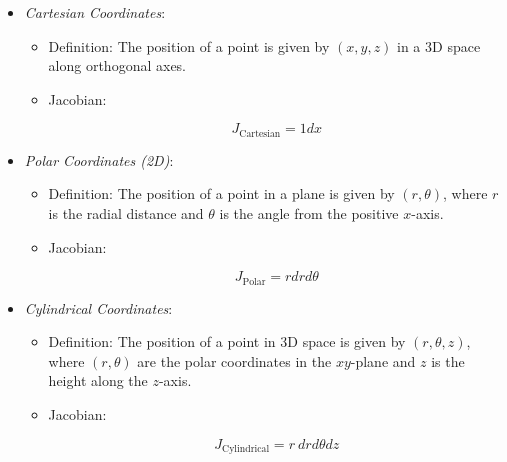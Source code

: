 \begin{itemize}

    \item \emph{Cartesian Coordinates}:

    \begin{itemize}
        
        \item Definition: The position of a point is given by \((x, y, z)\) in a 3D space along 
              orthogonal axes.
        
        \item Jacobian: 
        
            \[
                J_{\text{Cartesian}} = 1dx
            \]
    
    \end{itemize}

    \item \emph{Polar Coordinates (2D)}:

    \begin{itemize}

        \item Definition: The position of a point in a plane is given by \((r, \theta)\), where \(r\) 
              is the radial distance and \(\theta\) is the angle from the positive \(x\)-axis.
        
        \item Jacobian:
        
        \[
            J_{\text{Polar}} = rd rd\theta
        \]

    \end{itemize}

    \item \emph{Cylindrical Coordinates}:

    \begin{itemize}
        
        \item Definition: The position of a point in 3D space is given by \((r, \theta, z)\), where 
              \((r, \theta)\) are the polar coordinates in the \(xy\)-plane and \(z\) is the height along 
              the \(z\)-axis.
        
        \item Jacobian:
        
            \[
                J_{\text{Cylindrical}} = r\ dr d\theta dz
            \]

    \end{itemize}


\end{itemize}
